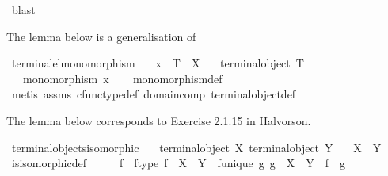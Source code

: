 \begin{isabellebody}
\ blast%
\endisatagproof
{\isafoldproof}%
%
\isadelimproof
%
\endisadelimproof
%
\begin{isamarkuptext}%
The lemma below is a generalisation of %
\end{isamarkuptext}\isamarkuptrue%
\isamarkupfalse%
\ terminal{\isacharunderscore}{\kern0pt}el{\isacharunderscore}{\kern0pt}monomorphism{\isacharcolon}{\kern0pt}\isanewline
\ \ \ {\isachardoublequoteopen}x\ {\isacharcolon}{\kern0pt}\ T\ {\isasymrightarrow}\ X{\isachardoublequoteclose}\isanewline
\ \ \ {\isachardoublequoteopen}terminal{\isacharunderscore}{\kern0pt}object\ T{\isachardoublequoteclose}\isanewline
\ \ \ {\isachardoublequoteopen}monomorphism\ x{\isachardoublequoteclose}\isanewline
%
\isadelimproof
\ \ %
\endisadelimproof
%
\isatagproof
{}\isamarkupfalse%
\ monomorphism{\isacharunderscore}{\kern0pt}def\isanewline
\ \ \isamarkupfalse%
\ {\isacharparenleft}{\kern0pt}metis\ assms\ cfunc{\isacharunderscore}{\kern0pt}type{\isacharunderscore}{\kern0pt}def\ domain{\isacharunderscore}{\kern0pt}comp\ terminal{\isacharunderscore}{\kern0pt}object{\isacharunderscore}{\kern0pt}def{\isacharparenright}{\kern0pt}%
\endisatagproof
{\isafoldproof}%
%
\isadelimproof
%
\endisadelimproof
%
\begin{isamarkuptext}%
The lemma below corresponds to Exercise 2.1.15 in Halvorson.%
\end{isamarkuptext}\isamarkuptrue%
\isamarkupfalse%
\ terminal{\isacharunderscore}{\kern0pt}objects{\isacharunderscore}{\kern0pt}isomorphic{\isacharcolon}{\kern0pt}\isanewline
\ \ \ {\isachardoublequoteopen}terminal{\isacharunderscore}{\kern0pt}object\ X{\isachardoublequoteclose}\ {\isachardoublequoteopen}terminal{\isacharunderscore}{\kern0pt}object\ Y{\isachardoublequoteclose}\isanewline
\ \ \ {\isachardoublequoteopen}X\ {\isasymcong}\ Y{\isachardoublequoteclose}\isanewline
%
\isadelimproof
\ \ %
\endisadelimproof
%
\isatagproof
{}\isamarkupfalse%
\ is{\isacharunderscore}{\kern0pt}isomorphic{\isacharunderscore}{\kern0pt}def\isanewline
{}\isamarkupfalse%
\ {\isacharminus}{\kern0pt}\isanewline
\ \ \isamarkupfalse%
\ f\ \ f{\isacharunderscore}{\kern0pt}type{\isacharcolon}{\kern0pt}\ {\isachardoublequoteopen}f\ {\isacharcolon}{\kern0pt}\ X\ {\isasymrightarrow}\ Y{\isachardoublequoteclose}\ \ f{\isacharunderscore}{\kern0pt}unique{\isacharcolon}{\kern0pt}\ {\isachardoublequoteopen}{\isasymforall}g{\isachardot}{\kern0pt}\ g\ {\isacharcolon}{\kern0pt}\ X\ {\isasymrightarrow}\ Y\ {\isasymlongrightarrow}\ f\ {\isacharequal}{\kern0pt}\ g{\isachardoublequoteclose}\isanewline

\end{isabellebody}
